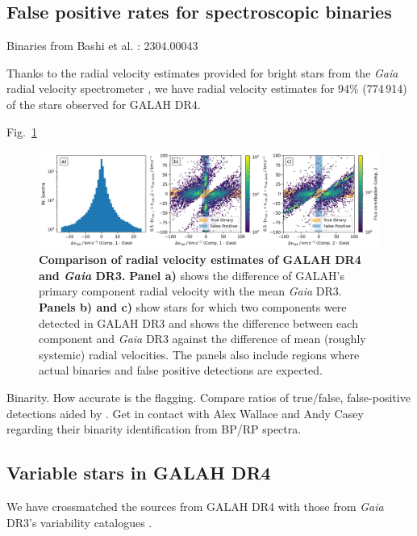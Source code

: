 \documentclass[
  journal=pasa,
  manuscript=research-paper, %
  year=2023,
  volume=37
]{cup-journal}
\newcommand{\Gaia}{\textit{Gaia}\xspace}
\begin{document}
\subsection{False positive rates for spectroscopic binaries}

Binaries from Bashi et al. : 2304.00043 \citep{Bashi2023}

Thanks to the radial velocity estimates provided for bright stars from the \Gaia radial velocity spectrometer \citep{Katz2022}, we have radial velocity estimates for 94\% (774\,914) of the stars observed for GALAH DR4.

Fig.~\ref{fig:vrad_comparison_comp1_comp2_gaiadr3}

\begin{figure}[hbt]
 \centering
 \includegraphics[width=\textwidth]{figures/vrad_comparison_comp1_comp2_gaiadr3.png}
 \caption{\textbf{Comparison of radial velocity estimates of GALAH DR4 and \textit{Gaia} DR3.} \textbf{Panel a)} shows the difference of GALAH's primary component radial velocity with the mean \textit{Gaia} DR3. \textbf{Panels b) and c)} show stars for which two components were detected in GALAH DR3 and shows the difference between each component and \textit{Gaia} DR3 against the difference of mean (roughly systemic) radial velocities. The panels also include regions where actual binaries and false positive detections are expected.}
 \label{fig:vrad_comparison_comp1_comp2_gaiadr3}
\end{figure}

Binarity. How accurate is the flagging. Compare ratios of true/false, false-positive detections aided by \citet{Traven2020}. Get in contact with Alex Wallace and Andy Casey regarding their binarity identification from BP/RP spectra.

\subsection{Variable stars in GALAH DR4}

We have crossmatched the sources from GALAH DR4 with those from \Gaia DR3's variability catalogues \citep{Rimoldini2023}.
\end{document}
